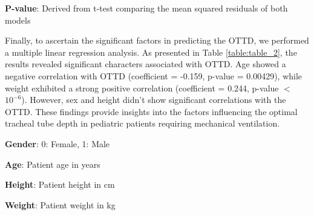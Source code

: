\documentclass[11pt]{article}
\begin{document}
\begin{table}[h]
\caption{Comparison of predictive power between Random Forest and Elastic Net models}
\label{table:table_1}
\begin{threeparttable}
\renewcommand{\TPTminimum}{\linewidth}
\begin{tablenotes}
\footnotesize
\item \textbf{P-value}: Derived from t-test comparing the mean squared residuals of both models
\end{tablenotes}
\end{threeparttable}
\end{table}


Finally, to ascertain the significant factors in predicting the OTTD, we performed a multiple linear regression analysis. As presented in Table {}\ref{table:table_2}, the results revealed significant characters associated with OTTD. Age showed a negative correlation with OTTD (coefficient = -0.159, p-value = 0.00429), while weight exhibited a strong positive correlation (coefficient = 0.244, p-value $<$ $10^{-6}$). However, sex and height didn't show significant correlations with the OTTD. These findings provide insights into the factors influencing the optimal tracheal tube depth in pediatric patients requiring mechanical ventilation.

\begin{table}[h]
\caption{Association of age, sex, height, and weight with OTTD}
\label{table:table_2}
\begin{threeparttable}
\renewcommand{\TPTminimum}{\linewidth}
\begin{tablenotes}
\footnotesize
\item \textbf{Gender}: 0: Female, 1: Male
\item \textbf{Age}: Patient age in years
\item \textbf{Height}: Patient height in cm
\item \textbf{Weight}: Patient weight in kg
\end{tablenotes}
\end{threeparttable}
\end{table}
\end{document}
